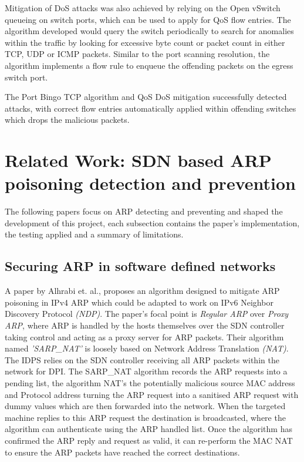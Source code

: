 \documentclass[12pt, oneside]{book}
\begin{document}
Mitigation of DoS attacks was also achieved by relying on the Open vSwitch queueing on switch ports, which can be used to apply for QoS
flow entries. The algorithm developed would query the switch periodically to search for anomalies within the traffic by looking for excessive
byte count or packet count in either TCP, UDP or ICMP packets. Similar to the port scanning resolution, the algorithm implements
a flow rule to enqueue the offending packets on the egress switch port.

The Port Bingo TCP algorithm and QoS DoS mitigation successfully detected attacks, with correct flow entries automatically applied within offending switches
which drops the malicious packets.


\section{Related Work: SDN based ARP poisoning detection and prevention}
The following papers focus on ARP detecting and preventing
and shaped the development of this project, each subsection contains the paper's implementation,
the testing applied and a summary of limitations.


\subsection{Securing ARP in software defined networks}
\label{subsec:secureARPLIT}
A paper by Alhrabi et. al.\cite{alharbi2016securing}, proposes an algorithm
designed to mitigate ARP poisoning in IPv4 ARP which could be adapted to work on IPv6 Neighbor Discovery Protocol \emph{(NDP)}.
The paper's focal point is \emph{Regular ARP} over \emph{Proxy ARP}, where ARP is handled by the hosts themselves over the SDN controller
taking control and acting as a proxy server for ARP packets.
Their algorithm named \emph{'SARP\_NAT'} is loosely based on Network Address Translation \emph{(NAT)}. The IDPS relies on the
SDN controller receiving all ARP packets within the network for DPI.
The SARP\_NAT algorithm records the ARP requests into a pending list,
the algorithm NAT's the potentially malicious source MAC address and Protocol address turning the ARP request into a sanitised ARP 
request with dummy values which are then forwarded into the network. When the targeted machine replies to this ARP request the destination is broadcasted,
where the algorithm can authenticate using the ARP handled list. Once the algorithm has confirmed the ARP reply and request as 
valid, it can re-perform the MAC NAT to ensure the ARP packets have reached the correct destinations.
\end{document}
